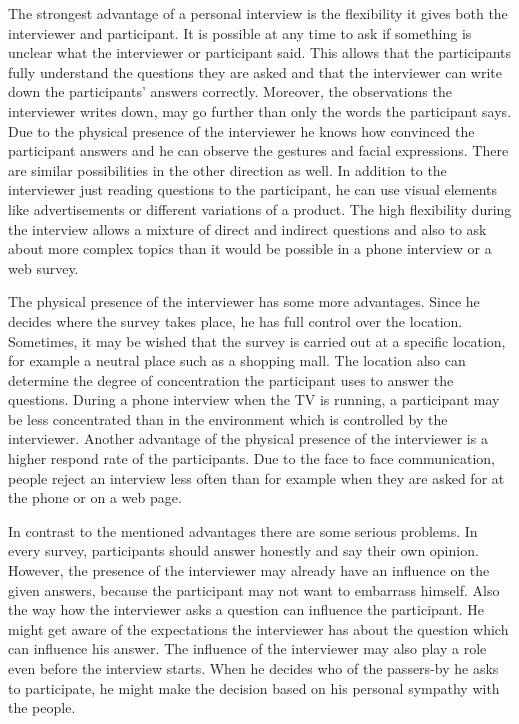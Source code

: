 \documentclass{report}
\begin{document}
The strongest advantage of a personal interview is the flexibility it gives both the interviewer and participant. It is possible at any time to ask if something is unclear what the interviewer or participant said. This allows that the participants fully understand the questions they are asked and that the interviewer can write down the participants’ answers correctly. Moreover, the observations the interviewer writes down, may go further than only the words the participant says. Due to the physical presence of the interviewer he knows how convinced the participant answers and he can observe the gestures and facial expressions. There are similar possibilities in the other direction as well. In addition to the interviewer just reading questions to the participant, he can use visual elements like advertisements or different variations of a product. The high flexibility during the interview allows a mixture of direct and indirect questions and also to ask about more complex topics than it would be possible in a phone interview or a web survey.

The physical presence of the interviewer has some more advantages. Since he decides where the survey takes place, he has full control over the location. Sometimes, it may be wished that the survey is carried out at a specific location, for example a neutral place such as a shopping mall. The location also can determine the degree of concentration the participant uses to answer the questions. During a phone interview when the TV is running, a participant may be less concentrated than in the environment which is controlled by the interviewer. Another advantage of the physical presence of the interviewer is a higher respond rate of the participants. Due to the face to face communication, people reject an interview less often than for example when they are asked for at the phone or on a web page.

In contrast to the mentioned advantages there are some serious problems. In every survey, participants should answer honestly and say their own opinion. However, the presence of the interviewer may already have an influence on the given answers, because the participant may not want to embarrass himself. Also the way how the interviewer asks a question can influence the participant. He might get aware of the expectations the interviewer has about the question which can influence his answer. The influence of the interviewer may also play a role even before the interview starts. When he decides who of the passers-by he asks to participate, he might make the decision based on his personal sympathy with the people.
\end{document}
